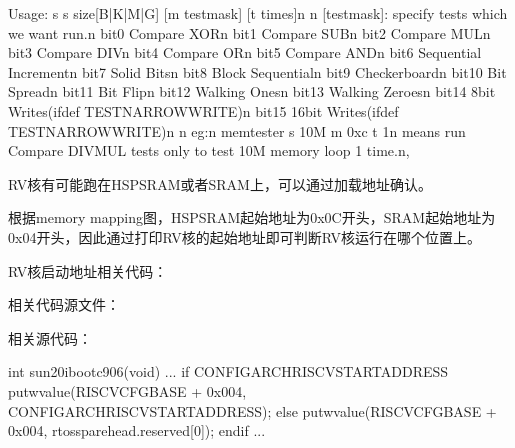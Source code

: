 \documentclass[letterpaper,10pt,english]{sphinxmanual}
\begin{document}
\begin{sphinxVerbatim}[commandchars=\\\{\}]
\PYGZdq{}Usage: \PYGZpc{}s \PYGZhy{}s \PYGZlt{}size\PYGZgt{}[B|K|M|G] [\PYGZhy{}m testmask] [\PYGZhy{}t times]\PYGZbs{}n\PYGZdq{}
\PYGZdq{}\PYGZbs{}n\PYGZdq{}
\PYGZdq{}[testmask]: specify tests which we want run.\PYGZbs{}n\PYGZdq{}
\PYGZdq{}bit0  Compare XOR\PYGZbs{}n\PYGZdq{}
\PYGZdq{}bit1  Compare SUB\PYGZbs{}n\PYGZdq{}
\PYGZdq{}bit2  Compare MUL\PYGZbs{}n\PYGZdq{}
\PYGZdq{}bit3  Compare DIV\PYGZbs{}n\PYGZdq{}
\PYGZdq{}bit4  Compare OR\PYGZbs{}n\PYGZdq{}
\PYGZdq{}bit5  Compare AND\PYGZbs{}n\PYGZdq{}
\PYGZdq{}bit6  Sequential Increment\PYGZbs{}n\PYGZdq{}
\PYGZdq{}bit7  Solid Bits\PYGZbs{}n\PYGZdq{}
\PYGZdq{}bit8  Block Sequential\PYGZbs{}n\PYGZdq{}
\PYGZdq{}bit9  Checkerboard\PYGZbs{}n\PYGZdq{}
\PYGZdq{}bit10 Bit Spread\PYGZbs{}n\PYGZdq{}
\PYGZdq{}bit11 Bit Flip\PYGZbs{}n\PYGZdq{}
\PYGZdq{}bit12 Walking Ones\PYGZbs{}n\PYGZdq{}
\PYGZdq{}bit13 Walking Zeroes\PYGZbs{}n\PYGZdq{}
\PYGZdq{}bit14 8\PYGZhy{}bit Writes(ifdef TEST\PYGZus{}NARROW\PYGZus{}WRITE)\PYGZbs{}n\PYGZdq{}
\PYGZdq{}bit15 16\PYGZhy{}bit Writes(ifdef TEST\PYGZus{}NARROW\PYGZus{}WRITE)\PYGZbs{}n\PYGZdq{}
\PYGZdq{}\PYGZbs{}n\PYGZdq{}
\PYGZdq{}eg:\PYGZbs{}n\PYGZdq{}
\PYGZdq{}    memtester \PYGZhy{}s 10M \PYGZhy{}m 0xc \PYGZhy{}t 1\PYGZbs{}n\PYGZdq{}
\PYGZdq{}    means run Compare DIV\PYGZam{}MUL tests only to test 10M memory loop 1 time.\PYGZbs{}n\PYGZdq{},
\end{sphinxVerbatim}

\sphinxAtStartPar
{}

\sphinxAtStartPar
RV核有可能跑在HS\sphinxhyphen{}PSRAM或者SRAM上，可以通过加载地址确认。

\sphinxAtStartPar
根据memory mapping图，HS\sphinxhyphen{}PSRAM起始地址为0x0C开头，SRAM起始地址为0x04开头，因此通过打印RV核的起始地址即可判断RV核运行在哪个位置上。

\sphinxAtStartPar
{}

\sphinxAtStartPar
RV核启动地址相关代码：

\sphinxAtStartPar
相关代码源文件：

\sphinxAtStartPar
相关源代码：

\begin{sphinxVerbatim}[commandchars=\\\{\}]
int sun20i\PYGZus{}boot\PYGZus{}c906(void)
\PYGZob{}
...
    \PYGZsh{}if CONFIG\PYGZus{}ARCH\PYGZus{}RISCV\PYGZus{}START\PYGZus{}ADDRESS
        put\PYGZus{}wvalue(RISCV\PYGZus{}CFG\PYGZus{}BASE + 0x004, CONFIG\PYGZus{}ARCH\PYGZus{}RISCV\PYGZus{}START\PYGZus{}ADDRESS);
    \PYGZsh{}else
        put\PYGZus{}wvalue(RISCV\PYGZus{}CFG\PYGZus{}BASE + 0x004, rtos\PYGZus{}spare\PYGZus{}head.reserved[0]);
    \PYGZsh{}endif
...
\PYGZcb{}
\end{sphinxVerbatim}
\end{document}
